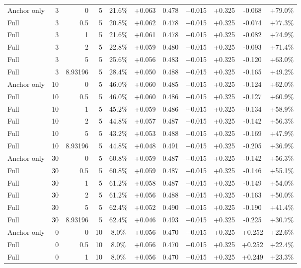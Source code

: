 \begin{table}[htbp]
\begin{tabular}{lrrrccccccc}
Anchor only & 3 & 0 & 5 & 21.6\% & +0.063 & 0.478 & +0.015 & +0.325 & -0.068 & +79.0\% \\
Full & 3 & 0.5 & 5 & 20.8\% & +0.062 & 0.478 & +0.015 & +0.325 & -0.074 & +77.3\% \\
Full & 3 & 1 & 5 & 21.6\% & +0.061 & 0.478 & +0.015 & +0.325 & -0.082 & +74.9\% \\
Full & 3 & 2 & 5 & 22.8\% & +0.059 & 0.480 & +0.015 & +0.325 & -0.093 & +71.4\% \\
Full & 3 & 5 & 5 & 25.6\% & +0.056 & 0.483 & +0.015 & +0.325 & -0.120 & +63.0\% \\
Full & 3 & 8.93196 & 5 & 28.4\% & +0.050 & 0.488 & +0.015 & +0.325 & -0.165 & +49.2\% \\
Anchor only & 10 & 0 & 5 & 46.0\% & +0.060 & 0.485 & +0.015 & +0.325 & -0.124 & +62.0\% \\
Full & 10 & 0.5 & 5 & 46.0\% & +0.060 & 0.486 & +0.015 & +0.325 & -0.127 & +60.9\% \\
Full & 10 & 1 & 5 & 45.2\% & +0.059 & 0.486 & +0.015 & +0.325 & -0.134 & +58.9\% \\
Full & 10 & 2 & 5 & 44.8\% & +0.057 & 0.487 & +0.015 & +0.325 & -0.142 & +56.3\% \\
Full & 10 & 5 & 5 & 43.2\% & +0.053 & 0.488 & +0.015 & +0.325 & -0.169 & +47.9\% \\
Full & 10 & 8.93196 & 5 & 44.8\% & +0.048 & 0.491 & +0.015 & +0.325 & -0.205 & +36.9\% \\
Anchor only & 30 & 0 & 5 & 60.8\% & +0.059 & 0.487 & +0.015 & +0.325 & -0.142 & +56.3\% \\
Full & 30 & 0.5 & 5 & 60.8\% & +0.059 & 0.487 & +0.015 & +0.325 & -0.146 & +55.1\% \\
Full & 30 & 1 & 5 & 61.2\% & +0.058 & 0.487 & +0.015 & +0.325 & -0.149 & +54.0\% \\
Full & 30 & 2 & 5 & 61.2\% & +0.056 & 0.488 & +0.015 & +0.325 & -0.163 & +50.0\% \\
Full & 30 & 5 & 5 & 62.4\% & +0.052 & 0.490 & +0.015 & +0.325 & -0.190 & +41.4\% \\
Full & 30 & 8.93196 & 5 & 62.4\% & +0.046 & 0.493 & +0.015 & +0.325 & -0.225 & +30.7\% \\
Anchor only & 0 & 0 & 10 & 8.0\% & +0.056 & 0.470 & +0.015 & +0.325 & +0.252 & +22.6\% \\
Full & 0 & 0.5 & 10 & 8.0\% & +0.056 & 0.470 & +0.015 & +0.325 & +0.252 & +22.4\% \\
Full & 0 & 1 & 10 & 8.0\% & +0.056 & 0.470 & +0.015 & +0.325 & +0.249 & +23.3\% \\

\end{tabular}
\end{table}
